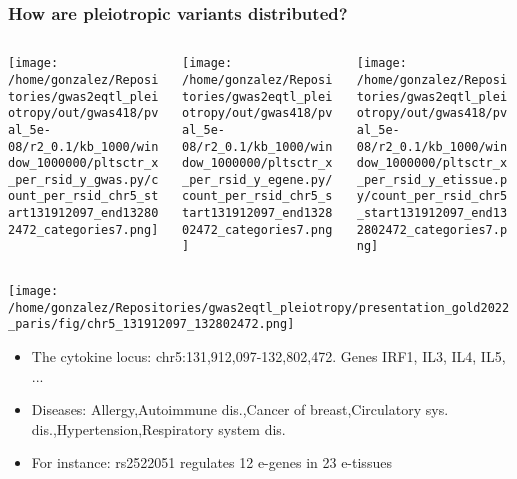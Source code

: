 \documentclass{beamer}
\begin{document}
\begin{frame}
\frametitle{How are pleiotropic variants distributed?}

\begin{columns}
\begin{column}{0.32\textwidth}
    \begin{center}
\texttt{[image: /home/gonzalez/Repositories/gwas2eqtl\_pleiotropy/out/gwas418/pval\_5e-08/r2\_0.1/kb\_1000/window\_1000000/pltsctr\_x\_per\_rsid\_y\_gwas.py/count\_per\_rsid\_chr5\_start131912097\_end132802472\_categories7.png]}
     \end{center}
\end{column}
\begin{column}{0.32\textwidth}
    \begin{center}
\texttt{[image: /home/gonzalez/Repositories/gwas2eqtl\_pleiotropy/out/gwas418/pval\_5e-08/r2\_0.1/kb\_1000/window\_1000000/pltsctr\_x\_per\_rsid\_y\_egene.py/count\_per\_rsid\_chr5\_start131912097\_end132802472\_categories7.png]}
     \end{center}
\end{column}
\begin{column}{0.32\textwidth}
    \begin{center}
\texttt{[image: /home/gonzalez/Repositories/gwas2eqtl\_pleiotropy/out/gwas418/pval\_5e-08/r2\_0.1/kb\_1000/window\_1000000/pltsctr\_x\_per\_rsid\_y\_etissue.py/count\_per\_rsid\_chr5\_start131912097\_end132802472\_categories7.png]}
     \end{center}
\end{column}
\end{columns}

\begin{center}
\texttt{[image: /home/gonzalez/Repositories/gwas2eqtl\_pleiotropy/presentation\_gold2022\_paris/fig/chr5\_131912097\_132802472.png]}
\end{center}

\small
\begin{itemize}
\item The cytokine locus: chr5:131,912,097-132,802,472. Genes IRF1, IL3, IL4, IL5, ...
\item Diseases: Allergy,Autoimmune dis.,Cancer of breast,Circulatory sys. dis.,Hypertension,Respiratory system dis.
\item For instance: rs2522051 regulates 12 e-genes in 23 e-tissues
\end{itemize}
\normalsize

\end{frame}
\end{document}
